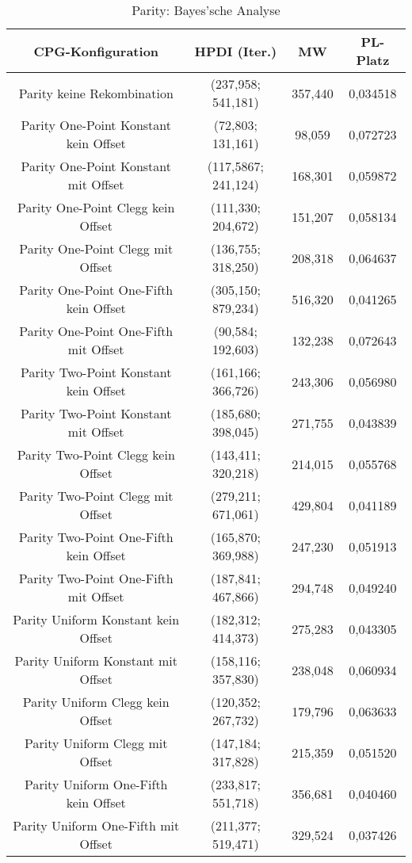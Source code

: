 \begin{table}[H]
	\centering
	\begin{tabular}{c | c | c | c}
		\textbf{CPG-Konfiguration} & \textbf{HPDI (Iter.)} & \textbf{MW} & \textbf{PL-Platz}\\
		\hline
		Parity keine Rekombination & (237,958; 541,181) & \color{red}357,440\color{black} & \color{red}0,034518\color{black}\\
		\hline
		\hline
		Parity One-Point Konstant kein Offset & (72,803; 131,161) & \color{Green}98,059\color{black} & \color{Green} 0,072723 \color{black}\\
		\hline
		Parity One-Point Konstant mit Offset & (117,5867; 241,124) & 168,301 & 0,059872\\
		\hline
		Parity One-Point Clegg kein Offset & (111,330; 204,672) & \color{Green}151,207\color{black} & 0,058134\\
		\hline
		Parity One-Point Clegg mit Offset & (136,755; 318,250) & 208,318 & \color{Green}0,064637\color{black}\\
		\hline
		Parity One-Point One-Fifth kein Offset & (305,150; 879,234) & \color{red}516,320\color{black} & 0,041265\\
		\hline
		Parity One-Point One-Fifth mit Offset & (90,584; 192,603) & \color{Green}132,238\color{black} & \color{Green}0,072643 \color{black}\\
		\hline
		\hline
		Parity Two-Point Konstant kein Offset & (161,166; 366,726) & 243,306 & 0,056980\\
		\hline
		Parity Two-Point Konstant mit Offset & (185,680; 398,045) & 271,755 & 0,043839\\
		\hline
		Parity Two-Point Clegg kein Offset & (143,411; 320,218) & 214,015 & 0,055768\\
		\hline
		Parity Two-Point Clegg mit Offset & (279,211; 671,061) & \color{red}429,804\color{black} & 0,041189\\
		\hline
		Parity Two-Point One-Fifth kein Offset & (165,870; 369,988) & 247,230 & 0,051913\\
		\hline
		Parity Two-Point One-Fifth mit Offset & (187,841; 467,866) & 294,748 & 0,049240\\
		\hline
		\hline
		Parity Uniform Konstant kein Offset & (182,312; 414,373) & 275,283 & 0,043305\\
		\hline
		Parity Uniform Konstant mit Offset & (158,116; 357,830) & 238,048 & 0,060934\\
		\hline
		Parity Uniform Clegg kein Offset & (120,352; 267,732) & 179,796 & 0,063633\\
		\hline
		Parity Uniform Clegg mit Offset & (147,184; 317,828) & 215,359 & 0,051520\\
		\hline
		Parity Uniform One-Fifth kein Offset & (233,817; 551,718) & 356,681 & \color{red}0,040460\color{black}\\
		\hline
		Parity Uniform One-Fifth mit Offset & (211,377; 519,471) & 329,524 & \color{red}0,037426\color{black}\\
	\end{tabular}
	\label{table:parityBayesian}
	\caption{Parity: Bayes'sche Analyse}
\end{table}



